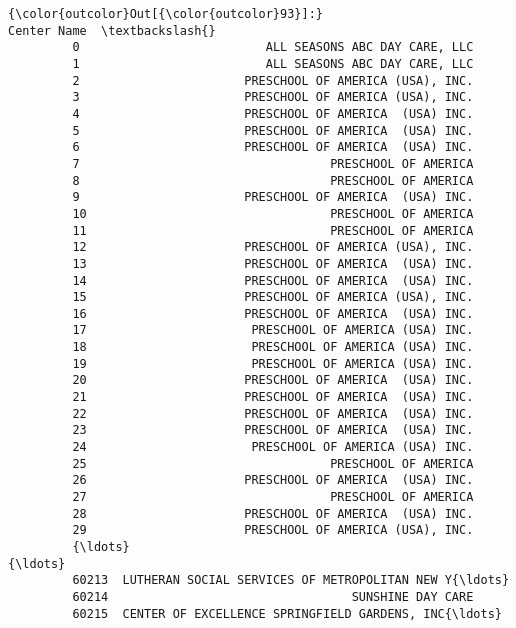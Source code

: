 \documentclass[11pt]{article}
\begin{document}
\begin{Verbatim}[commandchars=\\\{\}]
{\color{outcolor}Out[{\color{outcolor}93}]:}                                              Center Name  \textbackslash{}
         0                          ALL SEASONS ABC DAY CARE, LLC   
         1                          ALL SEASONS ABC DAY CARE, LLC   
         2                       PRESCHOOL OF AMERICA (USA), INC.   
         3                       PRESCHOOL OF AMERICA (USA), INC.   
         4                       PRESCHOOL OF AMERICA  (USA) INC.   
         5                       PRESCHOOL OF AMERICA  (USA) INC.   
         6                       PRESCHOOL OF AMERICA  (USA) INC.   
         7                                   PRESCHOOL OF AMERICA   
         8                                   PRESCHOOL OF AMERICA   
         9                       PRESCHOOL OF AMERICA  (USA) INC.   
         10                                  PRESCHOOL OF AMERICA   
         11                                  PRESCHOOL OF AMERICA   
         12                      PRESCHOOL OF AMERICA (USA), INC.   
         13                      PRESCHOOL OF AMERICA  (USA) INC.   
         14                      PRESCHOOL OF AMERICA  (USA) INC.   
         15                      PRESCHOOL OF AMERICA (USA), INC.   
         16                      PRESCHOOL OF AMERICA  (USA) INC.   
         17                       PRESCHOOL OF AMERICA (USA) INC.   
         18                       PRESCHOOL OF AMERICA (USA) INC.   
         19                       PRESCHOOL OF AMERICA (USA) INC.   
         20                      PRESCHOOL OF AMERICA  (USA) INC.   
         21                      PRESCHOOL OF AMERICA  (USA) INC.   
         22                      PRESCHOOL OF AMERICA  (USA) INC.   
         23                      PRESCHOOL OF AMERICA  (USA) INC.   
         24                       PRESCHOOL OF AMERICA (USA) INC.   
         25                                  PRESCHOOL OF AMERICA   
         26                      PRESCHOOL OF AMERICA  (USA) INC.   
         27                                  PRESCHOOL OF AMERICA   
         28                      PRESCHOOL OF AMERICA  (USA) INC.   
         29                      PRESCHOOL OF AMERICA (USA), INC.   
         {\ldots}                                                  {\ldots}   
         60213  LUTHERAN SOCIAL SERVICES OF METROPOLITAN NEW Y{\ldots}   
         60214                                  SUNSHINE DAY CARE   
         60215  CENTER OF EXCELLENCE SPRINGFIELD GARDENS, INC{\ldots}   

\end{Verbatim}
\end{document}
